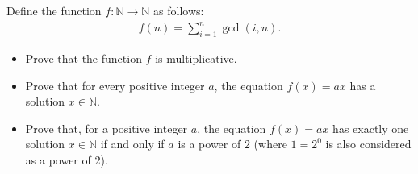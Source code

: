 \documentclass{subfile}
\begin{document}
%
%
%
%
%

	\begin{problem}
		Define the function $f: \mathbb{N}\to\mathbb{N}$ as follows:
			\begin{align*}
				f\left(n\right)=\sum_{i=1}^n\gcd\left(i, n\right).
			\end{align*}
		\begin{itemize}
			\item Prove that the function $f$ is multiplicative.
			\item Prove that for every positive integer $a$, the equation $f\left(x\right) = ax$ has a solution $x\in\mathbb{N}$.
			\item Prove that, for a positive integer $a$, the equation $f\left(x\right) = ax$ has exactly one solution $x\in\mathbb{N}$ if and only if $a$ is a power of $2$ (where $1=2^0$ is also considered as a power of $2$).
		\end{itemize}%
	\end{problem}
\end{document}
